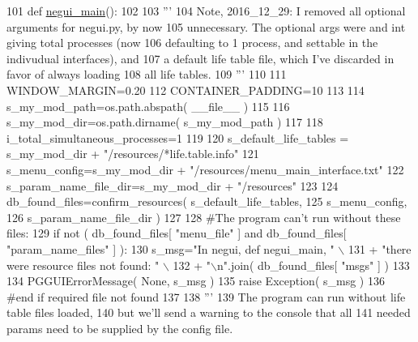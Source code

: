 \begin{DoxyCode}
101 \textcolor{keyword}{def }\hyperlink{namespacenegui_1_1negui_a3ae02c04d1a16d3a3f855196fa2be244}{negui\_main}():
102 
103     \textcolor{stringliteral}{'''}
104 \textcolor{stringliteral}{    Note, 2016\_12\_29: I removed all optional arguments for negui.py, by now}
105 \textcolor{stringliteral}{    unnecessary.  The optional args were and int giving total processes (now}
106 \textcolor{stringliteral}{    defaulting to 1 process, and settable in the indivudual interfaces), and}
107 \textcolor{stringliteral}{    a default life table file, which I've discarded in favor of always loading}
108 \textcolor{stringliteral}{    all life tables.}
109 \textcolor{stringliteral}{    '''}
110 
111     WINDOW\_MARGIN=0.20
112     CONTAINER\_PADDING=10
113     
114     s\_my\_mod\_path=os.path.abspath( \_\_file\_\_ )
115     
116     s\_my\_mod\_dir=os.path.dirname( s\_my\_mod\_path )
117 
118     i\_total\_simultaneous\_processes=1
119 
120     s\_default\_life\_tables = s\_my\_mod\_dir + \textcolor{stringliteral}{"/resources/*life.table.info"}
121     s\_menu\_config=s\_my\_mod\_dir + \textcolor{stringliteral}{"/resources/menu\_main\_interface.txt"} 
122     s\_param\_name\_file\_dir=s\_my\_mod\_dir + \textcolor{stringliteral}{"/resources"}
123 
124     db\_found\_files=confirm\_resources( s\_default\_life\_tables, 
125                                                 s\_menu\_config, 
126                                                 s\_param\_name\_file\_dir )
127 
128     \textcolor{comment}{#The program can't run without these files:}
129     \textcolor{keywordflow}{if} \textcolor{keywordflow}{not} ( db\_found\_files[ \textcolor{stringliteral}{"menu\_file"} ] \textcolor{keywordflow}{and} db\_found\_files[ \textcolor{stringliteral}{"param\_name\_files"} ] ):
130         s\_msg=\textcolor{stringliteral}{"In negui, def negui\_main, "} \(\backslash\)
131                 + \textcolor{stringliteral}{"there were resource files not found: "} \(\backslash\)
132                 + \textcolor{stringliteral}{"\(\backslash\)n"}.join( db\_found\_files[ \textcolor{stringliteral}{"msgs"} ] )
133         
134         PGGUIErrorMessage( \textcolor{keywordtype}{None}, s\_msg )
135         \textcolor{keywordflow}{raise} Exception( s\_msg )
136     \textcolor{comment}{#end if required file not found}
137 
138     \textcolor{stringliteral}{'''}
139 \textcolor{stringliteral}{    The program can run without life table files loaded,}
140 \textcolor{stringliteral}{    but we'll send a warning to the console that all}
141 \textcolor{stringliteral}{    needed params need to be supplied by the config file.}

\end{DoxyCode}

